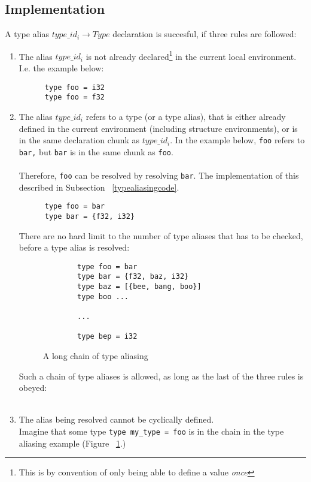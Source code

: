 \subsection{Implementation}\label{typealiasimplementation}
A type alias $type\_id_i \to Type$ declaration is succesful, if three rules are followed:
\begin{enumerate}
  \item The alias $type\_id_i$ is not already declared\footnote{This is by convention of
      only being able to define a value \textit{once}} in the current local
    environment. I.e. the example below:
    \begin{verbatim}
      type foo = i32
      type foo = f32
    \end{verbatim}
\clearpage
  \item The alias $type\_id_i$ refers to a type (or a type alias), that is either already
    defined in the current environment (including structure environments), or is
    in the same declaration chunk as $type\_id_i$. In the example below, \texttt{foo} refers
    to \texttt{bar,} but \texttt{bar} is in the same chunk as \texttt{foo}.\\
    \\
    Therefore, \texttt{foo} can be resolved by resolving \texttt{bar}. The implementation of this
    described in Subsection ~\ref{typealiasingcode}.
    \begin{verbatim} 
      type foo = bar
      type bar = {f32, i32}
    \end{verbatim}
    There are no hard limit to the number of type aliases that has to be
    checked, before a type alias is resolved:
	\begin{figure}
      \begin{verbatim}
        type foo = bar
        type bar = {f32, baz, i32}
        type baz = [{bee, bang, boo}]
        type boo ...
  
        ...
  
        type bep = i32
        \end{verbatim}
      \caption{A long chain of type aliasing \label{longchain}}
    \end{figure}
    Such a chain of type aliases is allowed, as long as the last of the three
    rules is obeyed:
    \\
    \\
  \item The alias being resolved cannot be cyclically defined.\\
    Imagine that some type \texttt{type my\_type = foo} is in the chain in the
    type aliasing example (Figure ~\ref{longchain}.)\\


\end{enumerate}
